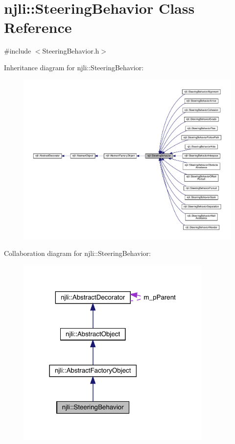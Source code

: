 \hypertarget{classnjli_1_1_steering_behavior}{}\section{njli\+:\+:Steering\+Behavior Class Reference}
\label{classnjli_1_1_steering_behavior}


{\ttfamily \#include $<$Steering\+Behavior.\+h$>$}



Inheritance diagram for njli\+:\+:Steering\+Behavior\+:\nopagebreak
\begin{figure}[H]
\begin{center}
\leavevmode
\includegraphics[width=350pt]{classnjli_1_1_steering_behavior__inherit__graph}
\end{center}
\end{figure}


Collaboration diagram for njli\+:\+:Steering\+Behavior\+:\nopagebreak
\begin{figure}[H]
\begin{center}
\leavevmode
\includegraphics[width=273pt]{classnjli_1_1_steering_behavior__coll__graph}
\end{center}
\end{figure}
